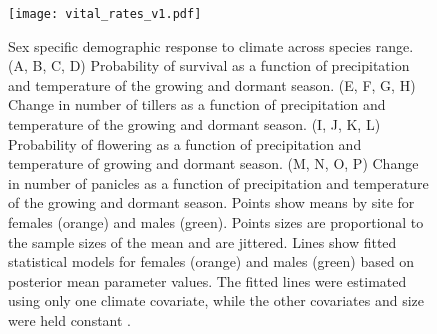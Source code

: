 \documentclass[9pt,twocolumn,twoside,lineno]{pnas-new}
\newcommand{\revise}[1]{{\color{Mahogany}{#1}}}
\begin{document}
\begin{figure}[H]
\centering
\texttt{[image: vital\_rates\_v1.pdf]}
\caption{Sex specific demographic response to climate across species range.
			(A, B, C, D) Probability of survival as a function of precipitation and temperature of the growing and dormant season.
			(E, F, G, H) Change in number of tillers as a function of precipitation and temperature of the growing and dormant season.
			(I, J, K, L) Probability of flowering as a function of precipitation and temperature of growing and dormant season.
			(M, N, O, P) Change in number of panicles as a function of precipitation and temperature of the growing and dormant season.
			Points show means by site for females (orange) and males (green). 
			Points sizes are proportional to the sample sizes of the mean and are jittered.
			Lines show fitted statistical models for females (orange) and males (green) based on posterior mean parameter values.
			The fitted lines were estimated using only one climate covariate, while the other covariates and size were held constant \revise{(mean)}. %
			}
\label{fig:vital_rates}
\end{figure}
\clearpage
\end{document}
